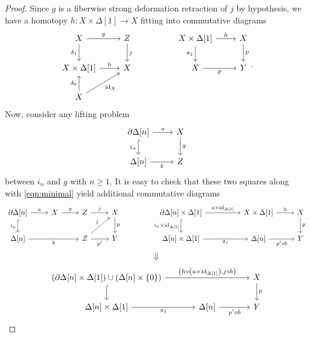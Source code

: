 \documentclass[10pt,letterpaper,cm]{nupset}
\theoremstyle{definition}
\theoremstyle{theorem}
\theoremstyle{remark}
\newcommand{\0}{\mathbf{0}}
\newcommand{\1}{\mathbf{1}}
\newcommand{\2}{\mathbf{2}}
\DeclareMathOperator{\idd}{id}
\begin{document}
\begin{proof}
Since $g$ is a fiberwise strong deformation retraction of $j$ by hypothesis, we have a homotopy $h:  X\times \Delta[1] \to X$ fitting into commutative diagrams
\[
\begin{tikzcd}
X \arrow[d, "\delta_1"'] \arrow[r, "g"]            & Z \arrow[d, "j"] &  & {X\times \Delta[1]} \arrow[r, "h"] \arrow[d, "\pi_1"'] & X \arrow[d, "p"] \\
{X\times \Delta[1]} \arrow[r, "h"]            & X                &  & X \arrow[r, "p"']                                      & Y                \\
X \arrow[u, "\delta_0"] \arrow[ru, "\idd_X"'] &                  &  &                                                        &                 
\end{tikzcd}
.\] Now, consider any lifting problem
\[
\begin{tikzcd}
{\partial{\Delta[n]}} \arrow[d, "i_n"', hook] \arrow[r, "a"] & X \arrow[d, "g"] \\
\Delta[n] \arrow[r, "b"']                                     & Z               
\end{tikzcd}
\] between $i_n$ and $g$ with $n\geq 1$. It is easy to check that these two squares along with \eqref{eqn:minimal} yield additional commutative diagrams
\[
\begin{tikzcd}
{\partial{\Delta[n]}} \arrow[r, "a"] \arrow[d, "i_n"', hook] & X \arrow[r, "g"] & Z \arrow[r, "j"]                   & X \arrow[d, "p"] &  & {\partial{\Delta[n]}\times \Delta[1]} \arrow[d, "{i_n\times \idd_{\Delta[1]}}"', hook] \arrow[rr, "{a\times \idd_{\Delta[1]}}"] &  & {X\times \Delta[1]} \arrow[r, "h"]   & X \arrow[d, "p"] \\
{\Delta[n]} \arrow[rr, "b"']                                 &                  & Z \arrow[ru, "j"] \arrow[r, "p'"'] & Y                &  & {\Delta[n]\times \Delta[1]} \arrow[rr, "\pi_1"']                                                                                &  & {\Delta[n]} \arrow[r, "p' \circ b"'] & Y               
\end{tikzcd}
\]
\[
\Downarrow
\]
\[
\begin{tikzcd}[column sep=large]
{\left(\partial{\Delta[n]}\times \Delta[1]\right)\cup \left(\Delta[n]\times \left\{0\right\}\right)} \arrow[rr, "{\left(h \circ \left(a\times \idd_{\Delta[1]}\right), j\circ b \right)}"] \arrow[d, hook] &                                     & X \arrow[d, "p"] \\
{\Delta[n]\times \Delta[1]} \arrow[r, "\pi_1"']                                                                                                                                                     & {\Delta[n]} \arrow[r, "p'\circ b"'] & Y               

\end{tikzcd}\]
\end{proof}
\end{document}

